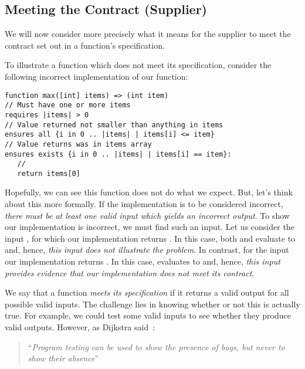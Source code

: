 \subsection{Meeting the Contract (Supplier)}

We will now consider more precisely what it means for the supplier to meet the contract set out in a function's specification.  

\begin{eg}
To illustrate a function which does not meet its specification, consider the following incorrect implementation of our  function:
\begin{lstlisting}
function max([int] items) => (int item) 
// Must have one or more items
requires |items| > 0
// Value returned not smaller than anything in items
ensures all {i in 0 .. |items| | items[i] <= item}
// Value returns was in items array
ensures exists {i in 0 .. |items| | items[i] == item}:
   //
   return items[0]
\end{lstlisting}
Hopefully, we can see this function does not do what we expect.  But, let's think about this more formally.  If the implementation is to be considered incorrect, {\em there must be at least one valid input which yields an incorrect output}.  To show our implementation is incorrect, we must find such an input.  Let us consider the input \lstinlinec{[5]}, for which our implementation returns .  In this case, both  and  evaluate to  and, hence, {\em this input does not illustrate the problem}.  In contrast, for the input \lstinlinec{[1,4]} our implementation returns .  In this case,  evaluates to  and, hence, {\em this input provides evidence that our implementation does not meet its contract}.
\end{eg}

We say that a function {\em meets its specification} if it returns a valid output for all possible valid inputs.  The challenge lies in knowing whether or not this is actually true.  For example, we could test some valid inputs to see whether they produce valid outputs.  However, as Dijkstra said~\cite{EWD249}:

\begin{quote}
 ``{\em Program testing can be used to show the presence of bugs, but never to show their absence}''
\end{quote}

